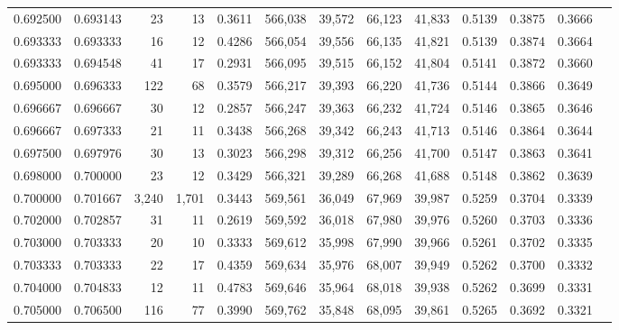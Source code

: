 \begin{tabular}{rrrrrrrrrrrrr}
0.692500 & 0.693143 &     23 &    13 &                                     0.3611 & 566,038 &  39,572 &  66,123 &  41,833 & 0.5139 & 0.3875 & 0.3666 \\
0.693333 & 0.693333 &     16 &    12 &                                     0.4286 & 566,054 &  39,556 &  66,135 &  41,821 & 0.5139 & 0.3874 & 0.3664 \\
0.693333 & 0.694548 &     41 &    17 &                                     0.2931 & 566,095 &  39,515 &  66,152 &  41,804 & 0.5141 & 0.3872 & 0.3660 \\
0.695000 & 0.696333 &    122 &    68 &                                     0.3579 & 566,217 &  39,393 &  66,220 &  41,736 & 0.5144 & 0.3866 & 0.3649 \\
0.696667 & 0.696667 &     30 &    12 &                                     0.2857 & 566,247 &  39,363 &  66,232 &  41,724 & 0.5146 & 0.3865 & 0.3646 \\
0.696667 & 0.697333 &     21 &    11 &                                     0.3438 & 566,268 &  39,342 &  66,243 &  41,713 & 0.5146 & 0.3864 & 0.3644 \\
0.697500 & 0.697976 &     30 &    13 &                                     0.3023 & 566,298 &  39,312 &  66,256 &  41,700 & 0.5147 & 0.3863 & 0.3641 \\
0.698000 & 0.700000 &     23 &    12 &                                     0.3429 & 566,321 &  39,289 &  66,268 &  41,688 & 0.5148 & 0.3862 & 0.3639 \\
0.700000 & 0.701667 &  3,240 & 1,701 &                                     0.3443 & 569,561 &  36,049 &  67,969 &  39,987 & 0.5259 & 0.3704 & 0.3339 \\
0.702000 & 0.702857 &     31 &    11 &                                     0.2619 & 569,592 &  36,018 &  67,980 &  39,976 & 0.5260 & 0.3703 & 0.3336 \\
0.703000 & 0.703333 &     20 &    10 &                                     0.3333 & 569,612 &  35,998 &  67,990 &  39,966 & 0.5261 & 0.3702 & 0.3335 \\
0.703333 & 0.703333 &     22 &    17 &                                     0.4359 & 569,634 &  35,976 &  68,007 &  39,949 & 0.5262 & 0.3700 & 0.3332 \\
0.704000 & 0.704833 &     12 &    11 &                                     0.4783 & 569,646 &  35,964 &  68,018 &  39,938 & 0.5262 & 0.3699 & 0.3331 \\
0.705000 & 0.706500 &    116 &    77 &                                     0.3990 & 569,762 &  35,848 &  68,095 &  39,861 & 0.5265 & 0.3692 & 0.3321 \\

\end{tabular}
